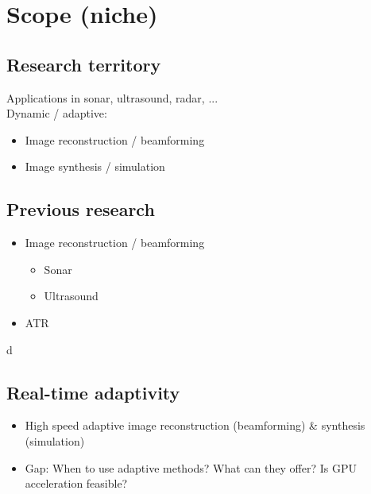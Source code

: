 \section{Scope (niche)}

\subsection{Research territory}
Applications in sonar, ultrasound, radar, ...\\
Dynamic / adaptive:
\begin{itemize}
  \item Image reconstruction / beamforming
  \item Image synthesis / simulation
\end{itemize}

\subsection{Previous research}
\begin{itemize}
\item Image reconstruction / beamforming
  \begin{itemize}
  \item Sonar
  \item Ultrasound
  \end{itemize}
\item ATR
\end{itemize}

d

\subsection{Real-time adaptivity }
\begin{itemize}
\item High speed adaptive image reconstruction (beamforming) \& synthesis (simulation)
\item Gap: When to use adaptive methods? What can they offer? Is GPU acceleration feasible?
\end{itemize}

